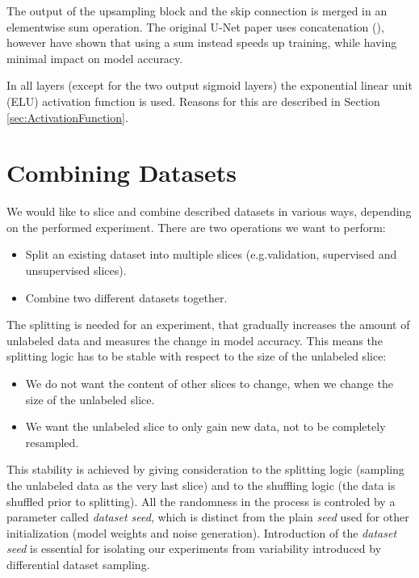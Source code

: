 The output of the upsampling block and the skip connection is merged in an elementwise sum operation. The original U-Net paper uses concatenation (\cite{UNet}), however \cite{DorferEtAl} have shown that using a sum instead speeds up training, while having minimal impact on model accuracy.

In all layers (except for the two output sigmoid layers) the exponential linear unit (ELU) activation function is used. Reasons for this are described in Section \ref{sec:ActivationFunction}.


\section{Combining Datasets}

We would like to slice and combine described datasets in various ways, depending on the performed experiment. There are two operations we want to perform:

\begin{itemize}
    \item Split an existing dataset into multiple slices (e.g.\@ validation, supervised and unsupervised slices).
    \item Combine two different datasets together.
\end{itemize}

The splitting is needed for an experiment, that gradually increases the amount of unlabeled data and measures the change in model accuracy. This means the splitting logic has to be stable with respect to the size of the unlabeled slice:

\begin{itemize}
    \item We do not want the content of other slices to change, when we change the size of the unlabeled slice.
    \item We want the unlabeled slice to only gain new data, not to be completely resampled.
\end{itemize}

This stability is achieved by giving consideration to the splitting logic (sampling the unlabeled data as the very last slice) and to the shuffling logic (the data is shuffled prior to splitting). All the randomness in the process is controled by a parameter called \emph{dataset seed}, which is distinct from the plain \emph{seed} used for other initialization (model weights and noise generation). Introduction of the \emph{dataset seed} is essential for isolating our experiments from variability introduced by differential dataset sampling.

